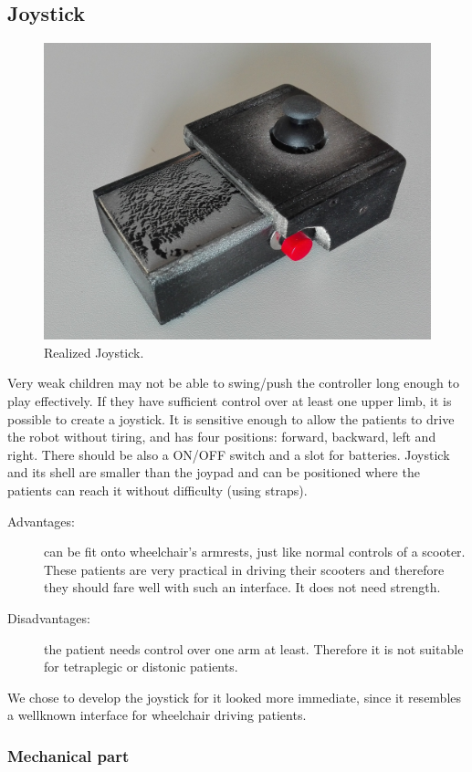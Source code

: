 \documentclass[a4paper,twoside]{book}
\begin{document}
\subsection{Joystick}

\begin{figure}[h]
\centering
\includegraphics[width=0.8\linewidth]{img/IMG_20160613_153916_1} 
\caption{Realized Joystick.}
\end{figure}

\beforelist* Very weak children may not be able to swing/push the controller long enough to play effectively. If they have sufficient control over at least one upper limb, it is possible to create a joystick. It is sensitive enough to allow the patients to drive the robot without tiring, and has four positions: forward, backward, left and right. There should be also a ON/OFF switch and a slot for batteries. Joystick and its shell are smaller than the joypad and can be positioned where the patients can reach it without difficulty (using straps).
\begin{description}
\item[Advantages:] can be fit onto wheelchair's armrests, just like normal controls of a scooter. These patients are very practical in driving their scooters and therefore they should fare well with such an interface. It does not need strength.
\item[Disadvantages:] the patient needs control over one arm at least. Therefore it is not suitable for tetraplegic or distonic patients.
\end{description}
\afterlist*
We chose to develop the joystick for it looked more immediate, since it resembles a well\textendash known interface for wheelchair driving patients.

\subsubsection{Mechanical part}
\end{document}
